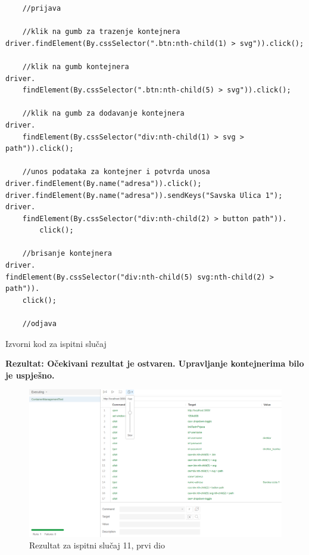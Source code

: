 		
\begin{lstlisting}
    //prijava
 
    //klik na gumb za trazenje kontejnera
driver.findElement(By.cssSelector(".btn:nth-child(1) > svg")).click();

    //klik na gumb kontejnera    
driver.
    findElement(By.cssSelector(".btn:nth-child(5) > svg")).click();
    
    //klik na gumb za dodavanje kontejnera
driver.
    findElement(By.cssSelector("div:nth-child(1) > svg > path")).click();
    
    //unos podataka za kontejner i potvrda unosa
driver.findElement(By.name("adresa")).click();
driver.findElement(By.name("adresa")).sendKeys("Savska Ulica 1");
driver.
    findElement(By.cssSelector("div:nth-child(2) > button path")).
        click();
        
    //brisanje kontejnera 
driver.
findElement(By.cssSelector("div:nth-child(5) svg:nth-child(2) > path")).
    click();
    
    //odjava
\end{lstlisting}

	\begin{listing}[H]
				\caption{Izvorni kod za ispitni slučaj \thetestcase}
				\label{test3}
			\end{listing}
			\noindent \textbf{Rezultat: Očekivani rezultat je ostvaren. Upravljanje kontejnerima bilo je uspješno. } 
			
			\begin{figure}[H]
            					\includegraphics[scale=0.5]{dokumentacija/slike/selenium/containermanagement.png}
            					\centering
            					\caption{Rezultat za ispitni slučaj 11, prvi dio}
            					\label{fig:test 11 p1}
            \end{figure}
            
